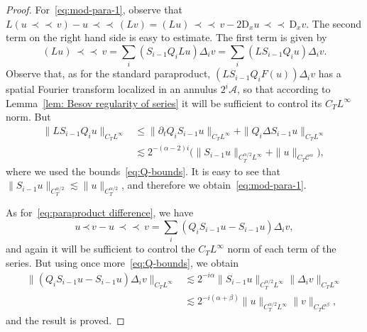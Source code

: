 \documentclass[a4paper,11pt]{article}
\newcommand{\mathD}{\mathrm{D}}
\theoremstyle{remark}
\newcommand{\CA}{\ensuremath{\mathscr{A}}}
\newcommand{\CC}{\ensuremath{\mathscr{C}}}
\newcommand{\lpara}{\,\mathord{\prec}\,}
\newcommand{\mpara}{\,\mathord{\prec\!\!\!\prec}\,}
\begin{document}
\begin{proof}
  For~\eqref{eq:mod-para-1}, observe that $L(u \mpara v ) - u\mpara (Lv) = (Lu) \mpara v - 2 \mathD_x u \mpara \mathD_x v$. The second term on the right hand side is easy to estimate. The first term is given by
  \[
     ( L u ) \mpara v = \sum_{i} ( S_{i-1} Q_{i} L u  )  \Delta_{i} v = \sum_{i} ( L S_{i-1} Q_{i} u ) \Delta_{i} v.
  \]
  Observe that, as for the standard paraproduct, $( L S_{i-1} Q_{i}  F ( u )) \Delta_{i} v$ has a spatial Fourier transform localized in an
  annulus $2^{i} \CA$, so that according to Lemma~\ref{lem: Besov regularity of series} it will be sufficient to control its $C_T L^\infty$ norm. But
  \begin{align*}
     \| L S_{i-1} Q_{i} u \|_{C_TL^{\infty}} & \leqslant \| \partial_{t} Q_{i} S_{i-1}  u  \|_{C_TL^{\infty}} + \| Q_{i} \Delta  S_{i-1}  u  \|_{C_TL^{\infty}} \\
     & \lesssim 2^{- ( \alpha -2 ) i} \big( \| S_{i-1}  u  \|_{C_{T}^{\alpha /2} L^{\infty}} + \| u \|_{C_{T} \CC^\alpha}\big),
  \end{align*}
  where we used the bounds~{\eqref{eq:Q-bounds}}. It is easy to see that $ \| S_{i-1}  u  \|_{C_{T}^{\alpha /2}} \lesssim \| u \|_{C_T^{\alpha/2}}$, and therefore we obtain~\eqref{eq:mod-para-1}.
  
  As for~\eqref{eq:paraproduct difference}, we have
  \[
     u \lpara v - u \mpara v = \sum_{i} ( Q_{i} S_{i-1}  u -S_{i-1}  u ) \Delta_{i} v,
  \]
  and again it will be sufficient to control the $C_T L^\infty$ norm of each term of the series. But using once more~{\eqref{eq:Q-bounds}}, we obtain
  \begin{align*}
     \| (Q_{i} S_{i-1}  u -S_{i-1}  u ) \Delta_{i} v \|_{C_T L^{\infty}} & \lesssim 2^{-i \alpha} \| S_{i-1} u \|_{C_{T}^{\alpha /2} L^{\infty}} \| \Delta_{i} v \|_{C_T L^{\infty}} \\
     & \lesssim 2^{-i(\alpha+\beta)} \| u \|_{C_{T}^{\alpha /2} L^{\infty}} \| v \|_{C_T\CC^{\beta}},
  \end{align*}
  and the result is proved.
\end{proof}
\end{document}
